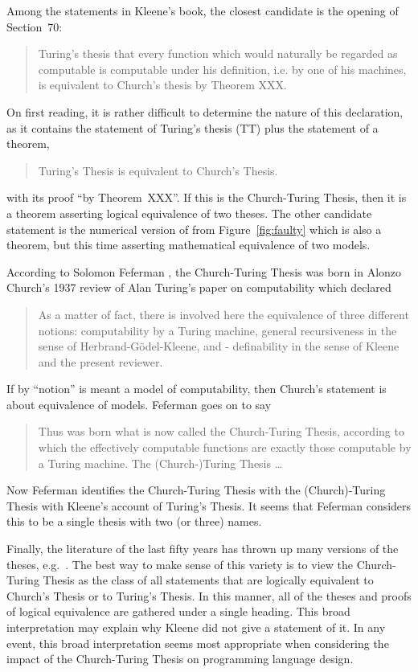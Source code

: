 \documentclass[a4paper]{article}
\begin{document}
Among the statements in Kleene's book, the closest candidate is the
opening of Section~70:
\begin{quote}
  Turing's thesis that every function which would naturally be
  regarded as computable is computable under his definition, i.e. by
  one of his machines, is equivalent to Church's thesis by Theorem
  XXX.
\end{quote}
On first reading, it is rather difficult to determine the nature of
this declaration, as it contains the statement of Turing's thesis (TT) 
plus the statement of a theorem, 
\begin{quote}
Turing's Thesis is equivalent to Church's Thesis.
\end{quote}
with its proof ``by Theorem~XXX''.  If this is the Church-Turing
Thesis, then it is a theorem asserting logical equivalence of two
theses. The other candidate statement is the numerical version of 
from Figure~\ref{fig:faulty} which is also a theorem, but this time
asserting mathematical equivalence of two models.

According to Solomon Feferman \cite{Feferman06}, the Church-Turing
Thesis was born in Alonzo Church's 1937 review of Alan Turing's paper
on computability \cite{Turing36} which declared
\begin{quote}
  As a matter of fact, there is involved here the equivalence of three
  different notions: computability by a Turing machine, general
  recursiveness in the sense of Herbrand-G\"odel-Kleene, and -
  definability in the sense of Kleene and the present reviewer.
\end{quote}
If by ``notion'' is meant a model of computability, then Church's
statement is about equivalence of models. Feferman goes on to say
\begin{quote}
Thus was born what is now called the Church-Turing Thesis, according
to which the effectively computable functions are exactly those
computable by a Turing machine.  The (Church-)Turing Thesis \ldots 
\end{quote}
Now Feferman identifies the Church-Turing Thesis with the
(Church)-Turing Thesis with Kleene's account of Turing's Thesis. It
seems that Feferman considers this to be a single thesis with two (or
three) names.

Finally, the literature of the last fifty years has thrown up many
versions of the theses, e.g.\ \cite{gandy, Soare96,BarendregtM13}. The
best way to make sense of this variety is to view the Church-Turing
Thesis as the class of all statements that are logically equivalent to
Church's Thesis or to Turing's Thesis.  In this manner, all of the
theses and proofs of logical equivalence are gathered under a single
heading.  This broad interpretation may explain why Kleene did not
give a statement of it.  In any event, this broad interpretation seems
most appropriate when considering the impact of the Church-Turing
Thesis on programming language design.
\end{document}
